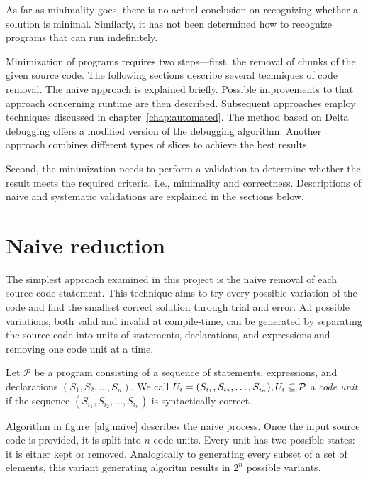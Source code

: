 
As far as minimality goes, there is no actual conclusion on recognizing 
whether a solution is minimal.
Similarly, it has not been determined how to recognize programs that can 
run indefinitely.

Minimization of programs requires two steps—first, the removal of chunks 
of the given source code. 
The following sections describe several techniques of code removal. 
The naive approach is explained briefly. 
Possible improvements to that approach concerning runtime are then described. 
Subsequent approaches employ techniques discussed in 
chapter~\ref{chap:automated}. 
The method based on Delta debugging offers a modified version of 
the debugging algorithm. 
Another approach combines different types of slices to achieve the best 
results.

Second, the minimization needs to perform a validation to determine whether 
the result meets the required criteria, i.e., minimality and correctness. 
Descriptions of naive and systematic validations are explained in the 
sections below.

\section{Naive reduction}\label{chap:naive}

The simplest approach examined in this project is the naive removal of each 
source code statement.
This technique aims to try every possible variation of the code and find 
the smallest correct solution through trial and error.
All possible variations, both valid and invalid at compile-time, can be 
generated by separating the source code into units of statements, 
declarations, and expressions and removing one code unit at a time.

\begin{defn}\label{def04:3}
  Let $\mathcal{P}$ be a program consisting of a sequence of statements, 
  expressions, and declarations $(S_1, S_2, \ldots, S_n)$. 
  We call $U_i = (S_{i_1},\-S_{i_2},\-\ldots,\-S_{i_n}), 
  U_i \subseteq \mathcal{P}$ a \emph{code unit} if the sequence 
  $(S_{i_1}, S_{i_2}, \ldots, S_{i_n})$ is syntactically
  correct.
\end{defn}

Algorithm in figure~\ref{alg:naive} describes the naive process. 
Once the input source code is provided, it is split into $n$ code units.
Every unit has two possible states: it is either kept or removed.
Analogically to generating every subset of a set of elements, this
variant generating algoritm results in $2^n$ possible variants.

